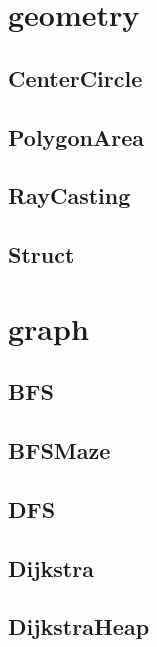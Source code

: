 \section{geometry}
\subsection{ CenterCircle}
\raggedbottom
\hrulefill
\subsection{ PolygonArea}
\raggedbottom
\hrulefill
\subsection{ RayCasting}
\raggedbottom
\hrulefill
\subsection{ Struct}
\raggedbottom
\hrulefill

\section{graph}
\subsection{ BFS}
\raggedbottom
\hrulefill
\subsection{ BFSMaze}
\raggedbottom
\hrulefill
\subsection{ DFS}
\raggedbottom
\hrulefill
\subsection{ Dijkstra}
\raggedbottom
\hrulefill
\subsection{ DijkstraHeap}
\raggedbottom
\hrulefill
